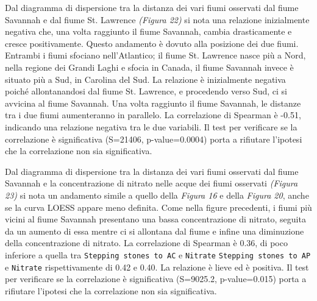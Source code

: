 \documentclass{article} %
\begin{document}
Dal diagramma di dispersione tra la distanza dei vari fiumi osservati dal fiume Savannah e dal fiume St. Lawrence \textit{(Figura 22)} si nota una relazione inizialmente negativa che, una volta raggiunto il fiume Savannah, cambia drasticamente e cresce positivamente. 
Questo andamento è dovuto alla posizione dei due fiumi. Entrambi i fiumi sfociano nell'Atlantico; il fiume St. Lawrence nasce più a Nord, nella regione dei Grandi Laghi e sfocia in Canada, il fiume Savannah invece è situato più a Sud, in Carolina del Sud. La relazione è inizialmente negativa poiché allontanandosi dal fiume St. Lawrence, e procedendo verso Sud, ci si avvicina al fiume Savannah. Una volta raggiunto il fiume Savannah, le distanze tra i due fiumi aumenteranno in parallelo.
La correlazione di Spearman è -0.51, indicando una relazione negativa tra le due variabili.  
Il test per verificare se la correlazione è significativa (S=21406, p-value=0.0004) porta a rifiutare l'ipotesi che la correlazione non sia significativa.

Dal diagramma di dispersione tra la distanza dei vari fiumi osservati dal fiume Savannah e la concentrazione di nitrato nelle acque dei fiumi osservati \textit{(Figura 23)} si nota un andamento simile a quello della \textit{Figura 16} e della \textit{Figura 20}, anche se la curva LOESS appare meno definita. 
Come nella figure precedenti, i fiumi più vicini al fiume Savannah presentano una bassa concentrazione di nitrato, seguita da un aumento di essa mentre ci si allontana dal fiume e infine una diminuzione della concentrazione di nitrato.
La correlazione di Spearman è 0.36, di poco inferiore a quella tra \texttt{Stepping stones to AC} e \texttt{Nitrate} \texttt{Stepping stones to AP} e \texttt{Nitrate} rispettivamente di 0.42 e 0.40. La relazione è lieve ed è positiva. 
Il test per verificare se la correlazione è significativa (S=9025.2, p-value=0.015) porta a rifiutare l'ipotesi che la correlazione non sia significativa.
\end{document}
